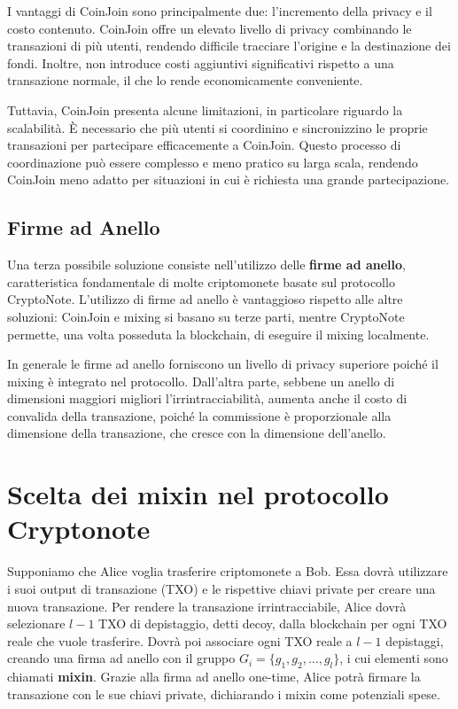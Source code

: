 I vantaggi di CoinJoin sono principalmente due: l'incremento della privacy e il costo contenuto. CoinJoin offre un elevato livello di privacy combinando le transazioni di più utenti, rendendo difficile tracciare l'origine e la destinazione dei fondi. Inoltre, non introduce costi aggiuntivi significativi rispetto a una transazione normale, il che lo rende economicamente conveniente.

Tuttavia, CoinJoin presenta alcune limitazioni, in particolare riguardo la scalabilità. È necessario che più utenti si coordinino e sincronizzino le proprie transazioni per partecipare efficacemente a CoinJoin. Questo processo di coordinazione può essere complesso e meno pratico su larga scala, rendendo CoinJoin meno adatto per situazioni in cui è richiesta una grande partecipazione.

\subsection{Firme ad Anello}
Una terza possibile soluzione consiste nell'utilizzo delle \textbf{firme ad anello}, caratteristica fondamentale di molte criptomonete basate sul protocollo CryptoNote. L'utilizzo di firme ad anello è vantaggioso rispetto alle altre soluzioni: CoinJoin e mixing si basano su terze parti, mentre CryptoNote permette, una volta posseduta la blockchain, di eseguire il mixing localmente.

In generale le firme ad anello forniscono un livello di privacy superiore poiché il mixing è integrato nel protocollo. Dall'altra parte, sebbene un anello di dimensioni maggiori migliori l'irrintracciabilità, aumenta anche il costo di convalida della transazione, poiché la commissione è proporzionale alla dimensione della transazione, che cresce con la dimensione dell'anello.

\section{Scelta dei mixin nel protocollo Cryptonote}
Supponiamo che Alice voglia trasferire criptomonete a Bob. Essa dovrà utilizzare i suoi output di transazione (TXO) e le rispettive chiavi private per creare una nuova transazione. Per rendere la transazione irrintracciabile, Alice dovrà selezionare \(l-1\) TXO di depistaggio, detti decoy, dalla blockchain per ogni TXO reale che vuole trasferire. Dovrà poi associare ogni TXO reale a \(l-1\) depistaggi, creando una firma ad anello con il gruppo \(G_i = \{g_1, g_2, \ldots, g_l\}\), i cui elementi sono chiamati \textbf{mixin}. Grazie alla firma ad anello one-time, Alice potrà firmare la transazione con le sue chiavi private, dichiarando i mixin come potenziali spese.


